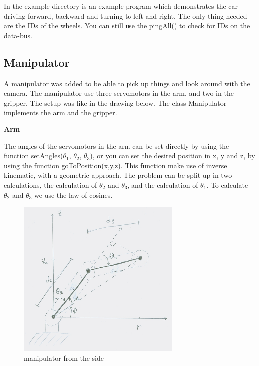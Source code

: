 In the example directory is an example program which demonstrates the car driving forward, backward and turning to left and right. The only thing needed are the IDs of the wheels. You can still use the pingAll() to check for IDs on the data-bus.

\subsection{Manipulator}

A manipulator was added to be able to pick up things and look around with the camera. The manipulator use three servomotors in the arm, and two in the gripper. The setup was like in the drawing below.
The class Manipulator implements the arm and the gripper.
\bigskip

\textbf{Arm}

The angles of the servomotors in the arm can be set directly by using the function setAngles($\theta_{1}$, $\theta_{2}$, $\theta_{3}$), or you can set the desired position in x, y and z, by using the function goToPosition(x,y,z). This function make use of inverse kinematic, with a geometric approach. 
The problem can be split up in two calculations, the calculation of $\theta_{2}$ and $\theta_{3}$, and the calculation of $\theta_{1}$. To calculate $\theta_{2}$ and $\theta_{3}$ we use the law of cosines.

\begin{figure}[H]
    \centering
    \includegraphics[width=0.7\textwidth]{graphics/Inverse_kinematic_1.jpg}	
    \caption{manipulator from the side}
    \label{fig:manipulator_side} 
\end{figure}

